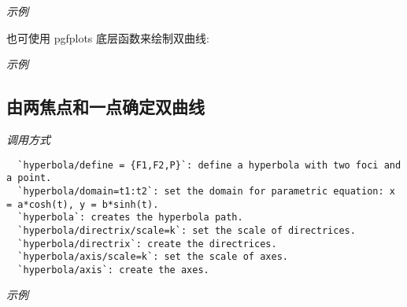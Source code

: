 \emph{示例}


也可使用 pgfplots 底层函数来绘制双曲线:

\emph{示例}


\subsection{由两焦点和一点确定双曲线}

\emph{调用方式}

\begin{verbatim}
  `hyperbola/define = {F1,F2,P}`: define a hyperbola with two foci and a point.
  `hyperbola/domain=t1:t2`: set the domain for parametric equation: x = a*cosh(t), y = b*sinh(t).
  `hyperbola`: creates the hyperbola path.
  `hyperbola/directrix/scale=k`: set the scale of directrices.
  `hyperbola/directrix`: create the directrices.
  `hyperbola/axis/scale=k`: set the scale of axes.
  `hyperbola/axis`: create the axes.
\end{verbatim}

\emph{示例}

